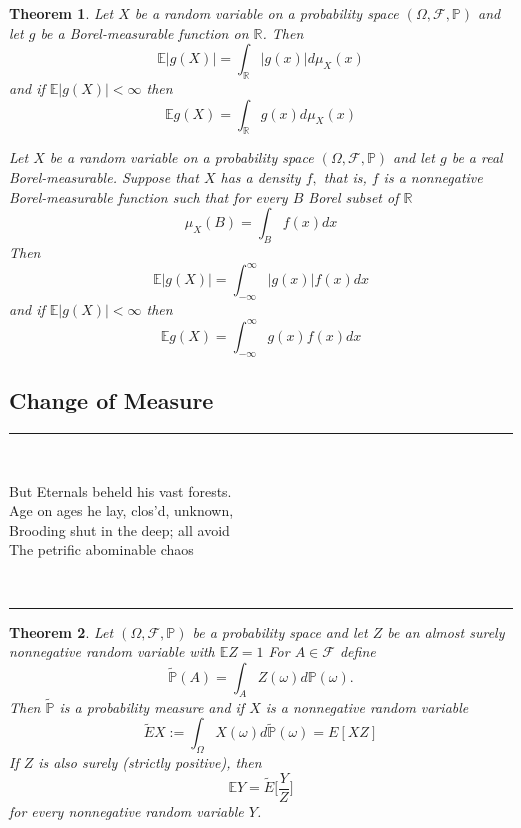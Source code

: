 \documentclass[reqno,a4paper,12pt]{amsart}%
\numberwithin{equation}{section}
\newtheorem{theorem}{Theorem}
\theoremstyle{definition}
\newcommand{\Ee}{{\mathbb{E}}}
\newcommand{\Pp}{{\mathbb{P}}}
\newcommand{\Rr}{{\mathbb{R}}}
\begin{document}
\begin{theorem}
	Let $X$ be a random variable on a probability space $(\Omega, \mathcal{F}, \Pp)$ and let $g$ be a Borel-measurable function on $\Rr$. Then $$\Ee |g(X)|= \int_\Rr |g(x)|d \mu_X(x) $$ and if $\Ee |g(X)|< \infty $ then 
$$\Ee g(X)= \int_\Rr g(x)d \mu_X(x) $$

Let $X$ be a random variable on a probability space $(\Omega, \mathcal{F}, \Pp)$ and
let $g$ be a real Borel-measurable. Suppose that $X$ has a density $f,$ that is, $f$ is a nonnegative Borel-measurable function such that for every $B$ Borel subset of $\Rr$
$$\mu_X (B)= \int_B f(x)dx $$
Then $$\Ee |g(X)|= \int_{-\infty}^{\infty} |g(x)|f(x)dx $$ and if  $\Ee |g(X)|< \infty $ then 
$$\Ee g(X)=  \int_{-\infty}^{\infty} g(x)f(x)dx  $$
\end{theorem}
 



\subsection{Change of Measure} 
 
\begin{center}
	\par\noindent\rule{200pt}{0.1pt}
\end{center}

\

\begin{center}		
But Eternals beheld his vast forests. \\
Age on ages he lay, clos'd, unknown, \\
Brooding shut in the deep; all avoid \\
The petrific abominable chaos
\end{center}


\

\begin{center}
	\par\noindent\rule{200pt}{0.1pt}
\end{center}

\begin{theorem}
	Let $(\Omega, \mathcal{F}, \Pp)$ be a probability space and let $Z$ be an almost surely nonnegative random variable with $\Ee Z= 1$ For $A \in \mathcal{F}$ define $$\tilde{\Pp}(A)= \int_A Z(\omega)d \Pp(\omega). $$
Then $\tilde{\Pp}$ is a probability measure and if $X$ is a nonnegative random variable $$\tilde{E}X:= \int_\Omega X (\omega)d \tilde{\Pp}(\omega) = E[XZ] $$ If $Z$ is also surely (strictly positive), then $$\Ee Y = \tilde{E}\Bigg[\frac{Y}{Z}\Bigg]$$
for every nonnegative random variable $Y$.
\end{theorem}
\end{document}
